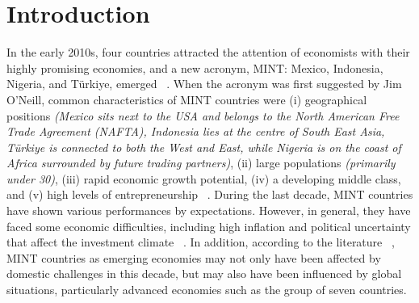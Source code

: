 \section{Introduction}
\label{sec:intro}
%
In the early 2010s, four countries attracted the attention of economists with their highly promising economies, and a new acronym, MINT: Mexico, Indonesia, Nigeria, and T\"{u}rkiye, emerged ~\citep{durotoye2014mint}. When the acronym was first suggested by Jim O'Neill, common characteristics of MINT countries were (i) geographical positions \textit{(Mexico sits next to the USA and belongs to the North American Free Trade Agreement (NAFTA), Indonesia lies at the centre of South East Asia, T\"{u}rkiye is connected to both the West and East, while Nigeria is on the coast of Africa surrounded by future trading partners)}, (ii) large populations \textit{(primarily under 30)}, (iii) rapid economic growth potential, (iv) a developing middle class, and (v) high levels of entrepreneurship ~\citep{Jim, Newland, Nagashybayeva}.  During the last decade, MINT countries have shown various performances by expectations. However, in general, they have faced some economic difficulties, including high inflation and political uncertainty that affect the investment climate ~\citep{Okoroafor}. In addition, according to the literature ~\cite{zhang2021stock,siddiqui2023assessing}, MINT countries as emerging economies may not only have been affected by domestic challenges in this decade, but may also have been influenced by global situations, particularly advanced economies such as the group of seven countries.

